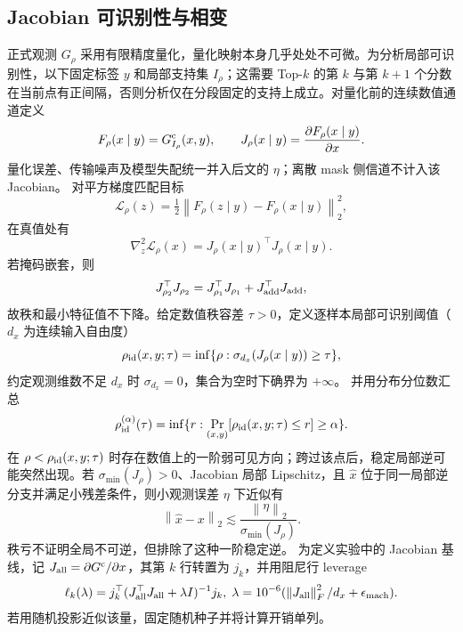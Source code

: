 \documentclass[conference,a4paper]{IEEEtran}
\newcommand{\norm}[1]{\left\lVert #1\right\rVert}
\begin{document}
\subsection{Jacobian 可识别性与相变}

正式观测 $G_\rho$ 采用有限精度量化，量化映射本身几乎处处不可微。为分析局部可识别性，以下固定标签 $y$ 和局部支持集 $I_\rho$；这需要 Top-$k$ 的第 $k$ 与第 $k+1$ 个分数在当前点有正间隔，否则分析仅在分段固定的支持上成立。对量化前的连续数值通道定义
\begin{equation}
F_\rho(x\mid y)=G^{\rm c}_{I_\rho}(x,y),\qquad
J_\rho(x\mid y)=\frac{\partial F_\rho(x\mid y)}{\partial x}.
\end{equation}
量化误差、传输噪声及模型失配统一并入后文的 $\eta$；离散 mask 侧信道不计入该 Jacobian。
对平方梯度匹配目标
\begin{equation}
\mathcal L_\rho(z)=\tfrac12\norm{F_\rho(z\mid y)-F_\rho(x\mid y)}_2^2,
\end{equation}
在真值处有
\begin{equation}
\nabla_z^2\mathcal L_\rho(x)=J_\rho(x\mid y)^\top J_\rho(x\mid y).
\label{eq:jacobian}
\end{equation}
若掩码嵌套，则
\begin{equation}
J_{\rho_2}^\top J_{\rho_2}
=J_{\rho_1}^\top J_{\rho_1}+J_{\rm add}^\top J_{\rm add},
\end{equation}
故秩和最小特征值不下降。给定数值秩容差 $\tau>0$，定义逐样本局部可识别阈值（$d_x$ 为连续输入自由度）
\begin{equation}
\rho_{\rm id}(x,y;\tau)=
\inf\{\rho:\sigma_{d_x}(J_\rho(x\mid y))\geq\tau\},
\end{equation}
约定观测维数不足 $d_x$ 时 $\sigma_{d_x}=0$，集合为空时下确界为 $+\infty$。
并用分布分位数汇总
\begin{equation}
\rho_{\rm id}^{(\alpha)}(\tau)=
\inf\{r:\Pr_{(x,y)}[\rho_{\rm id}(x,y;\tau)\leq r]\geq\alpha\}.
\end{equation}
在 $\rho<\rho_{\rm id}(x,y;\tau)$ 时存在数值上的一阶弱可见方向；跨过该点后，稳定局部逆可能突然出现。若 $\sigma_{\min}(J_\rho)>0$、Jacobian 局部 Lipschitz，且 $\widehat x$ 位于同一局部逆分支并满足小残差条件，则小观测误差 $\eta$ 下近似有
\begin{equation}
\norm{\widehat x-x}_2\lesssim
\frac{\norm{\eta}_2}{\sigma_{\min}(J_\rho)}.
\end{equation}
秩亏不证明全局不可逆，但排除了这种一阶稳定逆。
为定义实验中的 Jacobian 基线，记 $J_{\rm all}=\partial G^{\rm c}/\partial x$，其第 $k$ 行转置为 $j_k$，并用阻尼行 leverage
\begin{equation}
\ell_k(\lambda)=j_k^\top(J_{\rm all}^\top J_{\rm all}+\lambda I)^{-1}j_k,
\;\lambda=10^{-6}(\norm{J_{\rm all}}_F^2/d_x+\epsilon_{\rm mach}).
\label{eq:leverage}
\end{equation}
若用随机投影近似该量，固定随机种子并将计算开销单列。
\end{document}
